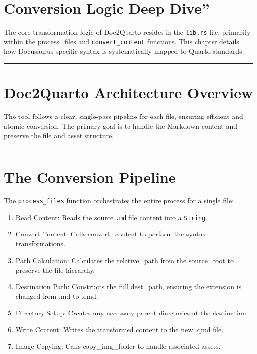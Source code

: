 \documentclass[
  letterpaper,
  DIV=11,
  numbers=noendperiod]{scrreprt}
\begin{document}
\chapter{Conversion Logic Deep Dive''}\label{conversion-logic-deep-dive}

The core transformation logic of Doc2Quarto resides in the
\texttt{lib.rs} file, primarily within the process\_files and
\texttt{convert\_content} functions. This chapter details how
Docusaurus-specific syntax is systematically mapped to Quarto standards.

\begin{center}\rule{0.5\linewidth}{0.5pt}\end{center}

\chapter{Doc2Quarto Architecture
Overview}\label{doc2quarto-architecture-overview}

The tool follows a clear, single-pass pipeline for each file, ensuring
efficient and atomic conversion. The primary goal is to handle the
Markdown content and preserve the file and asset structure.

\begin{center}\rule{0.5\linewidth}{0.5pt}\end{center}

\chapter{The Conversion Pipeline}\label{the-conversion-pipeline}

The \texttt{process\_files} function orchestrates the entire process for
a single file:

\begin{enumerate}
\def\labelenumi{\arabic{enumi}.}
\item
  Read Content: Reads the source \texttt{.md} file content into a
  \texttt{String}.
\item
  Convert Content: Calls convert\_content to perform the syntax
  transformations.
\item
  Path Calculation: Calculates the relative\_path from the source\_root
  to preserve the file hierarchy.
\item
  Destination Path: Constructs the full dest\_path, ensuring the
  extension is changed from .md to .qmd.
\item
  Directory Setup: Creates any necessary parent directories at the
  destination.
\item
  Write Content: Writes the transformed content to the new .qmd file.
\item
  Image Copying: Calls copy\_img\_folder to handle associated assets.
\end{enumerate}
\end{document}
